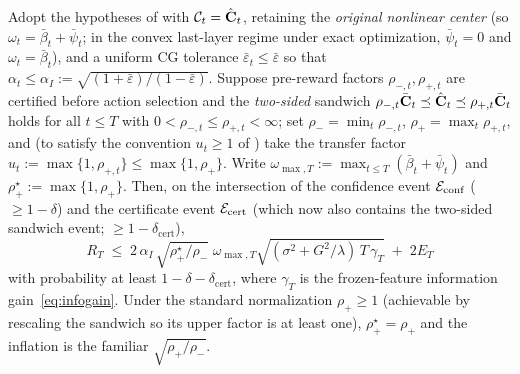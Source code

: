 \begin{corollary}\label{cor:twosided}
Adopt the hypotheses of  with $\mathcal{C}_t=\hat{\mathbf{C}}_t$, retaining the
\emph{original nonlinear center} (so $\omega_t=\bar\beta_t+\bar\psi_t$; in the
convex last-layer regime under exact optimization, $\bar\psi_t=0$ and
$\omega_t=\bar\beta_t$), and a uniform
CG tolerance $\bar\varepsilon_t\le\bar\varepsilon$ so that
$\alpha_t\le\alpha_I:=\sqrt{(1+\bar\varepsilon)/(1-\bar\varepsilon)}$.
Suppose pre-reward factors $\rho_{-,t},\rho_{+,t}$ are certified before
action selection and the \emph{two-sided} sandwich
$\rho_{-,t}\bar{\mathbf{C}}_t\preceq\hat{\mathbf{C}}_t\preceq\rho_{+,t}\bar{\mathbf{C}}_t$ holds for all
$t\le T$ with $0<\rho_{-,t}\le\rho_{+,t}<\infty$; set
$\rho_-=\min_t\rho_{-,t}$, $\rho_+=\max_t\rho_{+,t}$, and (to satisfy the
convention $u_t\ge1$ of ) take the transfer factor
$u_t:=\max\{1,\rho_{+,t}\}\le\max\{1,\rho_+\}$.  Write
$\omega_{\max,T}:=\max_{t\le T}(\bar\beta_t+\bar\psi_t)$ and
$\rho_+^{\star}:=\max\{1,\rho_+\}$.  Then, on the
intersection of the confidence event $\mathcal{E}_{\mathrm{conf}}$ ($\ge1-\delta$) and the
certificate event $\mathcal{E}_{\mathrm{cert}}$ (which now also contains the two-sided
sandwich event; $\ge1-\delta_{\mathrm{cert}}$),
\[
  R_T
  \;\le\;
  2\,\alpha_I\,\sqrt{\rho_+^{\star}/\rho_-}\;\omega_{\max,T}
  \sqrt{(\sigma^2+G^2/\lambda)\,T\,\gamma_T} \;+\; 2E_T
\]
with probability at least $1-\delta-\delta_{\mathrm{cert}}$, where $\gamma_T$ is
the frozen-feature information gain~\eqref{eq:infogain}.  Under the standard
normalization $\rho_+\ge1$ (achievable by rescaling the sandwich so its upper
factor is at least one), $\rho_+^{\star}=\rho_+$ and the inflation is the familiar
$\sqrt{\rho_+/\rho_-}$.
\end{corollary}
